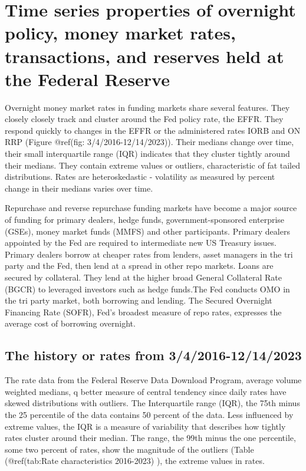 \documentclass[
]{article}
\begin{document}
\hypertarget{time-series-properties-of-overnight-policy-money-market-rates-transactions-and-reserves-held-at-the-federal-reserve}{%
\section{Time series properties of overnight policy, money market rates, transactions, and reserves held at the Federal Reserve}\label{time-series-properties-of-overnight-policy-money-market-rates-transactions-and-reserves-held-at-the-federal-reserve}}

Overnight money market rates in funding markets share several features. They closely closely track and cluster around the Fed policy rate, the EFFR. They respond quickly to changes in the EFFR or the administered rates IORB and ON RRP (Figure @ref(fig: 3/4/2016-12/14/2023)). Their medians change over time, their small interquartile range (IQR) indicates that they cluster tightly around their medians. They contain extreme values or outliers, characteristic of fat tailed distributions. Rates are heteroskedastic - volatility as measured by percent change in their medians varies over time.

Repurchase and reverse repurchase funding markets have become a major source of funding for primary dealers, hedge funds, government-sponsored enterprise (GSEs), money market funds (MMFS) and other participants. Primary dealers appointed by the Fed are required to intermediate new US Treasury issues. Primary dealers borrow at cheaper rates from lenders, asset managers in the tri party and the Fed, then lend at a spread in other repo markets. Loans are secured by collateral. They lend at the higher broad General Collateral Rate (BGCR) to leveraged investors such as hedge funds.The Fed conducts OMO in the tri party market, both borrowing and lending. The Secured Overnight Financing Rate (SOFR), Fed's broadest measure of repo rates, expresses the average cost of borrowing overnight.

\hypertarget{the-history-or-rates-from-342016-12142023}{%
\subsection{The history or rates from 3/4/2016-12/14/2023}\label{the-history-or-rates-from-342016-12142023}}

The rate data from the Federal Reserve Data Download Program, average volume weighted medians, q better measure of central tendency since daily rates have skewed distributions with outliers. The Interquartile range (IQR), the 75th minus the 25 percentile of the data contains 50 percent of the data. Less influenced by extreme values, the IQR is a measure of variability that describes how tightly rates cluster around their median. The range, the 99th minus the one percentile, some two percent of rates, show the magnitude of the outliers (Table (@ref(tab:Rate characteristics 2016-2023) ), the extreme values in rates.
\end{document}
